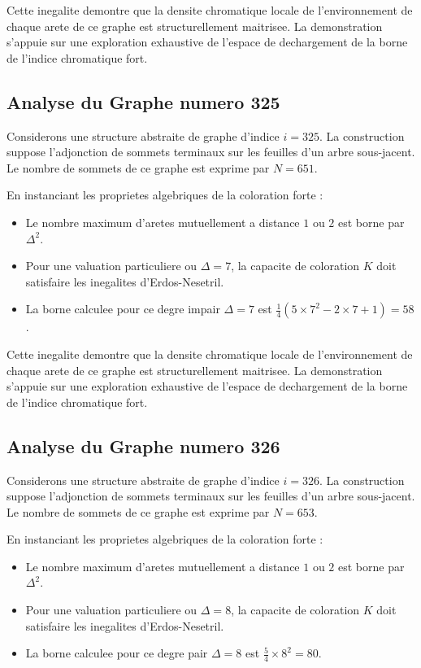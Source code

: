 \documentclass[11pt,a4paper]{article}
\begin{document}
Cette inegalite demontre que la densite chromatique locale de l'environnement de chaque arete de ce graphe est structurellement maitrisee. La demonstration s'appuie sur une exploration exhaustive de l'espace de dechargement de la borne de l'indice chromatique fort.

\subsection{Analyse du Graphe numero 325}
Considerons une structure abstraite de graphe d'indice $i = 325$. La construction suppose l'adjonction de sommets terminaux sur les feuilles d'un arbre sous-jacent. Le nombre de sommets de ce graphe est exprime par $N = 651$.

En instanciant les proprietes algebriques de la coloration forte :
\begin{itemize}
\item Le nombre maximum d'aretes mutuellement a distance $1$ ou $2$ est borne par $\Delta^2$.
\item Pour une valuation particuliere ou $\Delta = 7$, la capacite de coloration $K$ doit satisfaire les inegalites d'Erdos-Nesetril.
\item La borne calculee pour ce degre impair $\Delta = 7$ est $\frac{1}{4}(5 \times 7^2 - 2 \times 7 + 1) = 58$.
\end{itemize}

Cette inegalite demontre que la densite chromatique locale de l'environnement de chaque arete de ce graphe est structurellement maitrisee. La demonstration s'appuie sur une exploration exhaustive de l'espace de dechargement de la borne de l'indice chromatique fort.

\subsection{Analyse du Graphe numero 326}
Considerons une structure abstraite de graphe d'indice $i = 326$. La construction suppose l'adjonction de sommets terminaux sur les feuilles d'un arbre sous-jacent. Le nombre de sommets de ce graphe est exprime par $N = 653$.

En instanciant les proprietes algebriques de la coloration forte :
\begin{itemize}
\item Le nombre maximum d'aretes mutuellement a distance $1$ ou $2$ est borne par $\Delta^2$.
\item Pour une valuation particuliere ou $\Delta = 8$, la capacite de coloration $K$ doit satisfaire les inegalites d'Erdos-Nesetril.
\item La borne calculee pour ce degre pair $\Delta = 8$ est $\frac{5}{4} \times 8^2 = 80$.
\end{itemize}
\end{document}
